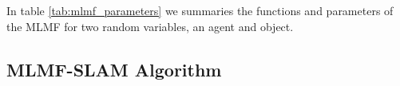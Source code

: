 In table \ref{tab:mlmf_parameters} we summaries the functions and parameters of the MLMF for two random variables, an agent and object.
\begin{table}[h]
\centering
{}
\caption{MLMF functions with associated parameters. The marginal parameters are the discretisation of the 
state space $\boldsymbol{\theta} \in \mathbb{R}^N$, $\boldsymbol{\theta}^{(k)}$ corresponds to the probability being in state $k$.}
\label{tab:mlmf_parameters}
\end{table}

\subsection{MLMF-SLAM Algorithm}

